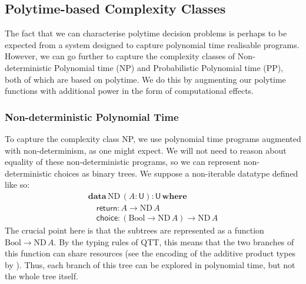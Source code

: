 \documentclass[acmsmall,screen]{acmart}
\newcommand{\BoolTy}{\mathrm{Bool}}
\begin{document}
\subsection{Polytime-based Complexity Classes}
\label{sec:classes}

The fact that we can characterise polytime decision problems is
perhaps to be expected from a system designed to capture polynomial
time realisable programs. However, we can go further to capture the
complexity classes of Non-deterministic Polynomial time (NP) and
Probabilistic Polynomial time (PP), both of which are based on
polytime. We do this by augmenting our polytime functions with
additional power in the form of computational effects.

\subsubsection{Non-deterministic Polynomial Time}
\label{sec:np-class}

To capture the complexity class NP, we use polynomial time programs
augmented with non-determinism, as one might expect. We will not need
to reason about equality of these non-deterministic programs, so we
can represent non-deterministic choices as binary trees. We suppose a
non-iterable datatype defined like so:
\begin{displaymath}
  \begin{array}{l}
    \textbf{data}\,\mathrm{ND}\,(A : \mathsf{U}) : \mathsf{U}\,\textbf{where} \\
    \quad \mathsf{return} : A \to \mathrm{ND}\,A \\
    \quad \mathsf{choice} : (\BoolTy \to \mathrm{ND}\,A) \to \mathrm{ND}\,A
  \end{array}
\end{displaymath}
The crucial point here is that the subtrees are represented as a
function $\BoolTy \to \mathrm{ND}\,A$. By the typing rules of QTT,
this means that the two branches of this function can share resources
(see the encoding of the additive product types by
\citet{atkey18qtt}). Thus, each branch of this tree can be explored in
polynomial time, but not the whole tree itself.
\end{document}
